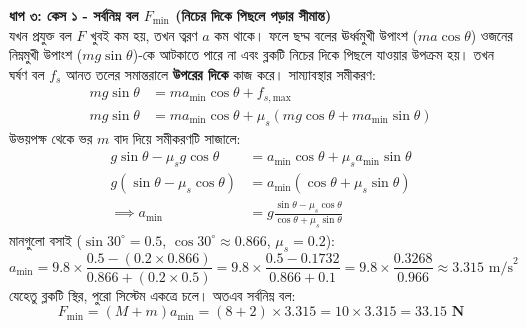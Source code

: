 \documentclass[12pt, a4paper]{article}
\begin{document}
\begin{tcolorbox}[solutionbox={সমাধান (Solution)}]
\vspace{0.5em}
\noindent
\textbf{ধাপ ৩: কেস ১ - সর্বনিম্ন বল $F_{\text{min}}$ (নিচের দিকে পিছলে পড়ার সীমান্ত)} \\
যখন প্রযুক্ত বল $F$ খুবই কম হয়, তখন ত্বরণ $a$ কম থাকে। ফলে ছদ্ম বলের ঊর্ধ্বমুখী উপাংশ ($ma\cos\theta$) ওজনের নিম্নমুখী উপাংশ ($mg\sin\theta$)-কে আটকাতে পারে না এবং ব্লকটি নিচের দিকে পিছলে যাওয়ার উপক্রম হয়। তখন ঘর্ষণ বল $f_s$ আনত তলের সমান্তরালে \textbf{উপরের দিকে} কাজ করে।
সাম্যাবস্থার সমীকরণ:
\begin{align*}
mg \sin\theta &= ma_{\text{min}} \cos\theta + f_{s,\text{max}} \\
mg \sin\theta &= ma_{\text{min}} \cos\theta + \mu_s (mg \cos\theta + ma_{\text{min}} \sin\theta)
\end{align*}
উভয়পক্ষ থেকে ভর $m$ বাদ দিয়ে সমীকরণটি সাজালে:
\begin{align*}
g \sin\theta - \mu_s g \cos\theta &= a_{\text{min}} \cos\theta + \mu_s a_{\text{min}} \sin\theta \\
g(\sin\theta - \mu_s \cos\theta) &= a_{\text{min}}(\cos\theta + \mu_s \sin\theta) \\
\implies a_{\text{min}} &= g \frac{\sin\theta - \mu_s \cos\theta}{\cos\theta + \mu_s \sin\theta}
\end{align*}
মানগুলো বসাই ($\sin 30^\circ = 0.5$, $\cos 30^\circ \approx 0.866$, $\mu_s = 0.2$):
\[ a_{\text{min}} = 9.8 \times \frac{0.5 - (0.2 \times 0.866)}{0.866 + (0.2 \times 0.5)} = 9.8 \times \frac{0.5 - 0.1732}{0.866 + 0.1} = 9.8 \times \frac{0.3268}{0.966} \approx 3.315 \text{ m/s}^2 \]
যেহেতু ব্লকটি স্থির, পুরো সিস্টেম একত্রে চলে। অতএব সর্বনিম্ন বল:
\[ F_{\text{min}} = (M + m) a_{\text{min}} = (8 + 2) \times 3.315 = 10 \times 3.315 = \mathbf{33.15 \text{ N}} \]


\end{tcolorbox}
\end{document}
